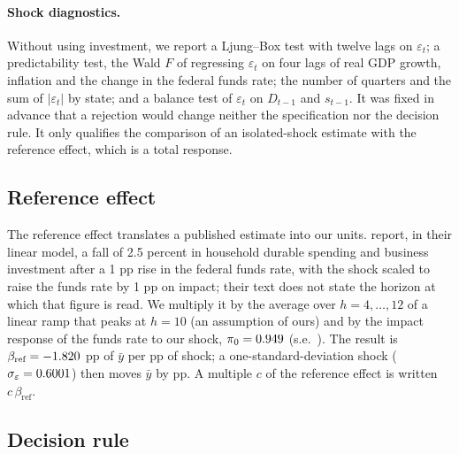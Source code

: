 \documentclass[11pt]{article}
\theoremstyle{remark}
\begin{document}
\paragraph{Shock diagnostics.}
Without using investment, we report a Ljung--Box test with twelve lags on $\varepsilon_t$; a predictability test, the Wald $F$ of
regressing $\varepsilon_t$ on four lags of real GDP growth, inflation and the change in the federal funds rate; the number of
quarters and the sum of $|\varepsilon_t|$ by state; and a balance test of $\varepsilon_t$ on $D_{t-1}$ and $s_{t-1}$. It was
fixed in advance that a rejection would change neither the specification nor the decision rule. It only qualifies the
comparison of an isolated-shock estimate with the reference effect, which is a total response.

\subsection{Reference effect}

The reference effect translates a published estimate into our units. \citet[WP pp.~11--12]{TenreyroThwaites2016} report, in their linear model, a fall of
2.5 percent in household durable spending and business investment after a 1 pp rise in the federal funds rate, %
with the shock scaled to raise the funds rate by 1 pp on impact; their text does not state the horizon at which that figure is
read. We multiply it by the average over $h=4,\dots,12$ of a linear ramp that peaks at $h=10$ (an assumption of ours) and by the
impact response of the funds rate to our shock, $\pi_0=0.949$ (s.e.\ \piZeroSe). The result is
$\beta_{\text{ref}}=-1.820$ pp of $\bar y$ per pp of shock; a one-standard-deviation shock ($\sigma_\varepsilon=0.6001$) then
moves $\bar y$ by \betaRefSd{} pp. A multiple $c$ of the reference effect is written $c\,\beta_{\text{ref}}$.

\subsection{Decision rule}
\end{document}
